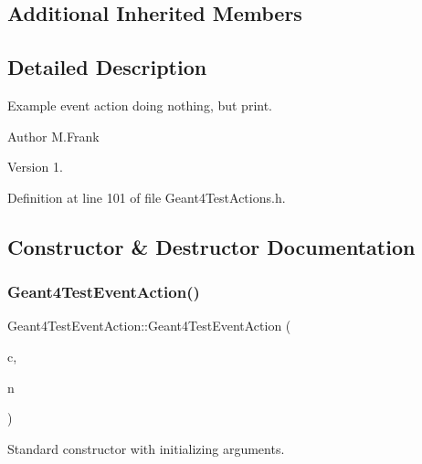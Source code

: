 \subsection*{Additional Inherited Members}


\subsection{Detailed Description}
Example event action doing nothing, but print. 

\begin{DoxyAuthor}{Author}
M.\+Frank 
\end{DoxyAuthor}
\begin{DoxyVersion}{Version}
1. 
\end{DoxyVersion}


Definition at line 101 of file Geant4\+Test\+Actions.\+h.



\subsection{Constructor \& Destructor Documentation}
\hypertarget{class_d_d4hep_1_1_simulation_1_1_test_1_1_geant4_test_event_action_a00fe97a5df38edd9785f25af737cd7d0}{}\label{class_d_d4hep_1_1_simulation_1_1_test_1_1_geant4_test_event_action_a00fe97a5df38edd9785f25af737cd7d0} 
\subsubsection{\texorpdfstring{Geant4\+Test\+Event\+Action()}{Geant4TestEventAction()}}
{\footnotesize\ttfamily Geant4\+Test\+Event\+Action\+::\+Geant4\+Test\+Event\+Action (\begin{DoxyParamCaption}\item[{\hyperlink{class_d_d4hep_1_1_simulation_1_1_geant4_context}{Geant4\+Context} $\ast$}]{c,  }\item[{const std\+::string \&}]{n }\end{DoxyParamCaption})}



Standard constructor with initializing arguments. 



